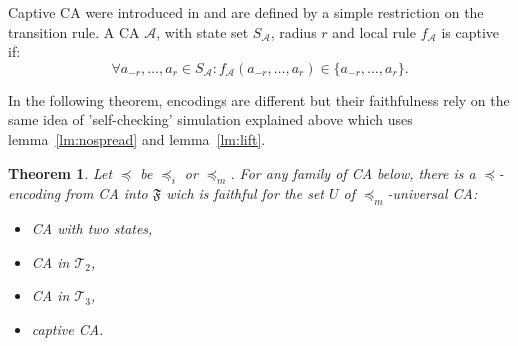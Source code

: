 \documentclass[a4paper]{elsarticle}
\newcommand{\ACA}{\mathcal{A}}
\newcommand{\locA}{f_{\ACA}}
\newcommand\alphabe[1]{S_{#1}}
\newcommand{\alphA}{\alphabe{\ACA}}
\newcommand{\simu}{\preccurlyeq}
\newcommand{\sacsimu}{\simu_i}
\newcommand{\facsacsimu}{\simu_m}
\newcommand\equipt{\mathcal{T}_2}
\newcommand\sensi{\mathcal{T}_3}
\newcommand\fami{\mathfrak{F}}
\newtheorem{thm}{Theorem}[section]
\begin{document}
Captive CA were introduced in \cite{Theyssier04} and are defined by a
simple restriction on the transition rule. A CA $\ACA$, with state set
$\alphA$, radius $r$ and local rule $\locA$ is captive if:
\[\forall a_{-r},\ldots,a_r\in\alphA:
\locA(a_{-r},\ldots,a_r)\in\{a_{-r},\ldots,a_r\}.\]

In the following theorem, encodings are different but their
faithfulness rely on the same idea of 'self-checking' simulation
explained above which uses lemma~\ref{lm:nospread} and
lemma~\ref{lm:lift}.

\begin{thm}
  \label{thm:encodings}
  Let $\simu$ be $\sacsimu$ or $\facsacsimu$.  For any family of CA
  below, there is a $\simu$-encoding from CA into $\fami$ wich is
  faithful for the set $U$ of $\facsacsimu$-universal CA:
  \begin{itemize}
  \item CA with two states,
  \item CA in $\equipt$,
  \item CA in $\sensi$, 
  \item captive CA.
  \end{itemize}
\end{thm}
\end{document}
